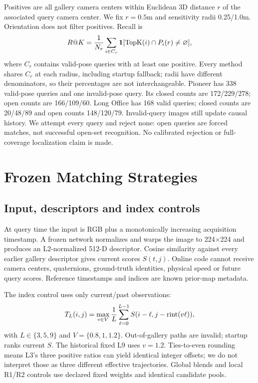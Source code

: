 \documentclass[conference,letterpaper]{IEEEtran}
\begin{document}
Positives are all gallery camera centers within Euclidean 3D distance $r$ of the associated query camera center. We fix $r=0.5$m and sensitivity radii 0.25/1.0m. Orientation does not filter positives. Recall is
\begin{equation}
R@K={1\over N_r}\sum_{i\in C_r}\mathbf{1}[\operatorname{TopK}(i)\cap P_i(r)\ne\varnothing],
\end{equation}
where $C_r$ contains valid-pose queries with at least one positive. Every method shares $C_r$ at each radius, including startup fallback; radii have different denominators, so their percentages are not interchangeable. Pioneer has 338 valid-pose queries and one invalid-pose query. Its closed counts are 172/229/278; open counts are 166/109/60. Long Office has 168 valid queries; closed counts are 20/48/89 and open counts 148/120/79. Invalid-query images still update causal history. We attempt every query and reject none: open queries are forced matches, not successful open-set recognition. No calibrated rejection or full-coverage localization claim is made.

\section{Frozen Matching Strategies}
\subsection{Input, descriptors and index controls}
At query time the input is RGB plus a monotonically increasing acquisition timestamp. A frozen network normalizes and warps the image to 224$\times$224 and produces an L2-normalized 512-D descriptor. Cosine similarity against every earlier gallery descriptor gives current scores $S(t,j)$. Online code cannot receive camera centers, quaternions, ground-truth identities, physical speed or future query scores. Reference timestamps and indices are known prior-map metadata.

The index control uses only current/past observations:
\begin{equation}
T_L(i,j)=\max_{v\in V}{1\over L}\sum_{\ell=0}^{L-1}S(i-\ell,j-\operatorname{rint}(v\ell)),
\end{equation}
with $L\in\{3,5,9\}$ and $V=\{0.8,1,1.2\}$. Out-of-gallery paths are invalid; startup ranks current $S$. The historical fixed L9 uses $v=1.2$. Ties-to-even rounding means L3's three positive ratios can yield identical integer offsets; we do not interpret those as three different effective trajectories. Global blends and local R1/R2 controls use declared fixed weights and identical candidate pools.
\end{document}
